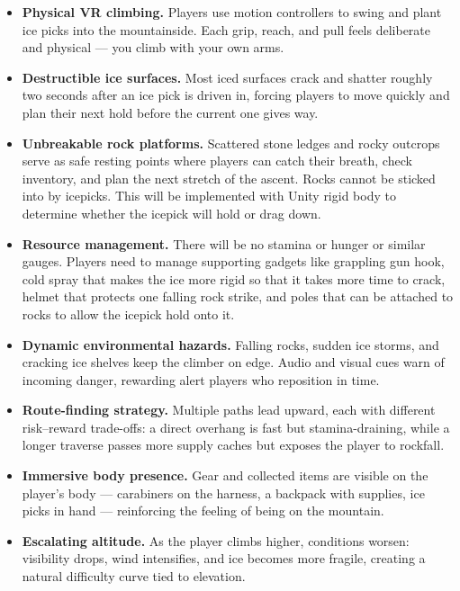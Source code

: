 \documentclass[12pt]{article}
\begin{document}
\begin{itemize}[leftmargin=2em]
    \item \textbf{Physical VR climbing.} Players use motion controllers to swing and plant ice picks into the mountainside. Each grip, reach, and pull feels deliberate and physical --- you climb with your own arms.

    \item \textbf{Destructible ice surfaces.} Most iced surfaces crack and shatter roughly two seconds after an ice pick is driven in, forcing players to move quickly and plan their next hold before the current one gives way.

    \item \textbf{Unbreakable rock platforms.} Scattered stone ledges and rocky outcrops serve as safe resting points where players can catch their breath, check inventory, and plan the next stretch of the ascent. Rocks cannot be sticked into by icepicks. This will be implemented with Unity rigid body to determine whether the icepick will hold or drag down.

    \item \textbf{Resource management.} There will be no stamina or hunger or similar gauges. Players need to manage supporting gadgets like grappling gun hook, cold spray that makes the ice more rigid so that it takes more time to crack, helmet that protects one falling rock strike, and poles that can be attached to rocks to allow the icepick hold onto it.

    \item \textbf{Dynamic environmental hazards.} Falling rocks, sudden ice storms, and cracking ice shelves keep the climber on edge. Audio and visual cues warn of incoming danger, rewarding alert players who reposition in time.

    \item \textbf{Route-finding strategy.} Multiple paths lead upward, each with different risk--reward trade-offs: a direct overhang is fast but stamina-draining, while a longer traverse passes more supply caches but exposes the player to rockfall.

    \item \textbf{Immersive body presence.} Gear and collected items are visible on the player's body --- carabiners on the harness, a backpack with supplies, ice picks in hand --- reinforcing the feeling of being on the mountain.

    \item \textbf{Escalating altitude.} As the player climbs higher, conditions worsen: visibility drops, wind intensifies, and ice becomes more fragile, creating a natural difficulty curve tied to elevation.
\end{itemize}
\end{document}
